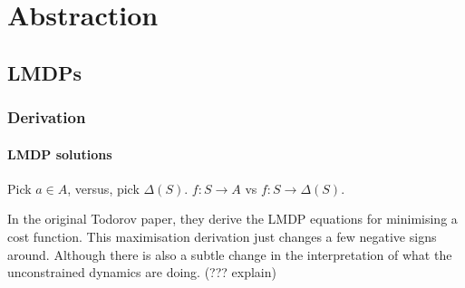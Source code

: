 \chapter{Abstraction}

\section{LMDPs}

\subsection{Derivation}

\subsubsection{LMDP solutions}

Pick $a \in A$, versus, pick $\Delta(S)$. $f: S\to A$ vs $f:S \to \Delta(S)$.

In the original Todorov paper, they derive the LMDP equations for minimising a cost function. This maximisation derivation just changes a few negative signs around. Although there is also a subtle change in the interpretation of what the unconstrained dynamics are doing. (??? explain)

